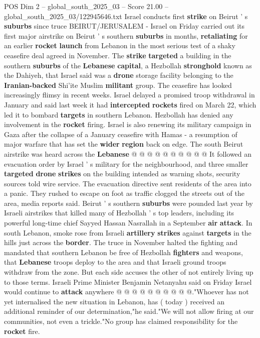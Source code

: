 \begin{textsample}{POS Dim 2 – global\_south\_2025\_03 – Score 21.00 – global\_south\_2025\_03/122945646.txt}  \label{ex:f2_pos_282}
Israel conducts first \textbf{strike} on Beirut ' s \textbf{suburbs} since truce BEIRUT/JERUSALEM - Israel on Friday carried out its first major airstrike on Beirut ' s southern \textbf{suburbs} in months, \textbf{retaliating} for an earlier \textbf{rocket} \textbf{launch} from Lebanon in the most serious test of a shaky ceasefire deal agreed in November.
The \textbf{strike} \textbf{targeted} a building in the southern \textbf{suburbs} of the \textbf{Lebanese} \textbf{capital}, a Hezbollah \textbf{stronghold} known as the Dahiyeh, that Israel said was a \textbf{drone} storage facility belonging to the \textbf{Iranian-backed} Shi'ite Muslim \textbf{militant} group.
The ceasefire has looked increasingly flimsy in recent weeks.
Israel delayed a promised troop withdrawal in January and said last week it had \textbf{intercepted} \textbf{rockets} fired on March 22, which led it to bombard \textbf{targets} in southern Lebanon.
Hezbollah has denied any involvement in the \textbf{rocket} firing.
Israel is also renewing its military campaign in Gaza after the collapse of a January ceasefire with Hamas - a resumption of major warfare that has set the \textbf{wider} \textbf{region} back on edge.
The south Beirut airstrike was heard across the \textbf{Lebanese} @ @ @ @ @ @ @ @ @ @ It followed an evacuation order by Israel ' s military for the neighbourhood, and three smaller \textbf{targeted} \textbf{drone} \textbf{strikes} on the building intended as warning shots, security sources told wire service.
The evacuation directive sent residents of the area into a panic.
They rushed to escape on foot as traffic clogged the streets out of the area, media reports said.
Beirut ' s southern \textbf{suburbs} were pounded last year by Israeli airstrikes that killed many of Hezbollah ' s top leaders, including its powerful long-time chief Sayyed Hassan Nasrallah in a September \textbf{air} \textbf{attack}.
In south Lebanon, smoke rose from Israeli \textbf{artillery} \textbf{strikes} against \textbf{targets} in the hills just across the \textbf{border}.
The truce in November halted the fighting and mandated that southern Lebanon be free of Hezbollah \textbf{fighters} and weapons, that \textbf{Lebanese} troops deploy to the area and that Israeli ground troops withdraw from the zone.
But each side accuses the other of not entirely living up to those terms.
Israeli Prime Minister Benjamin Netanyahu said on Friday Israel would continue to \textbf{attack} anywhere @ @ @ @ @ @ @ @ @ @."Whoever has not yet internalised the new situation in Lebanon, has ( today ) received an additional reminder of our determination,"he said."We will not allow firing at our communities, not even a trickle."No group has claimed responsibility for the \textbf{rocket} fire.

\end{textsample}
